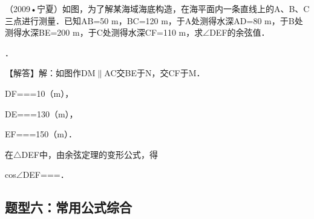 \begin{question}
（2009•宁夏）如图，为了解某海域海底构造，在海平面内一条直线上的A、B、C三点进行测量．已知AB=50 m，BC=120 m，于A处测得水深AD=80 m，于B处测得水深BE=200 m，于C处测得水深CF=110 m，求$\angle$DEF的余弦值．\par
{}\allowbreak{}．\par
\begin{solution}
【解答】解：如图作DM$\parallel$AC交BE于N，交CF于M．\par
DF=\allowbreak{}=\allowbreak{}=10\allowbreak{}（m），\par
DE=\allowbreak{}=\allowbreak{}=130（m），\par
EF=\allowbreak{}=\allowbreak{}=150（m）．\par
在$\triangle$DEF中，由余弦定理的变形公式，得\par
cos$\angle$DEF=\allowbreak{}=\allowbreak{}=\allowbreak{}．\par
\begin{center}
\allowbreak{}
\end{center}
\end{solution}
\end{question}

\subsection{题型六：常用公式综合}

